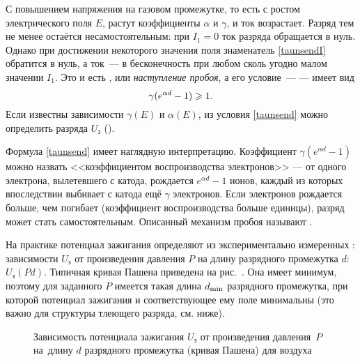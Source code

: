 С повышением напряжения на газовом промежутке, то есть с ростом электрического
поля $E$, растут коэффициенты $\alpha$ и $\gamma$, и ток возрастает.
Разряд тем не менее остаётся несамостоятельным: при $I_1=0$ ток разряда
обращается в нуль. Однако при достижении некоторого значения поля
знаменатель \eqref{taunsendI} обратится в нуль,
а ток~--- в бесконечность при любом сколь угодно малом значении $I_1$.
Это и есть , или \emph{наступление пробоя}, а его
условие~---  --- имеет вид
\begin{equation}
    \eqmark{taunsend}
	\gamma(e^{\alpha d}-1)\ge 1.
\end{equation}
Если известны зависимости $\gamma(E)$ и $\alpha(E)$, из условия \eqref{taunsend}
можно определить  разряда $U_{з}$
().

Формула \eqref{taunsend} имеет наглядную интерпретацию. 
Коэффициент $\gamma (e^{\alpha d}-1)$ можно назвать
<<коэффициентом воспроизводства электронов>> --- от одного электрона,
вылетевшего с катода, рождается $e^{\alpha d}-1$ ионов,
каждый из которых впоследствии выбивает с катода ещё $\gamma$ электронов.
Если электронов рождается больше, чем погибает (коэффициент воспроизводства больше единицы), 
разряд может стать самостоятельным.
Описанный механизм пробоя называют . 

На практике потенциал зажигания определяют из экспериментально измеренных
: зависимости $U_{з}$ от произведения
давления $P$ на длину разрядного промежутка $d$: $U_{з}(Pd)$.
Типичная кривая Пашена приведена на рис.~.
Она имеет минимум, поэтому для заданного $P$ имеется такая длина
$d_{\rm min}$ разрядного промежутка,
при которой потенциал зажигания и соответствующее ему поле минимальны
(это важно для структуры тлеющего разряда, см. ниже).

\begin{figure}[h!]
	\centering
\footnotesize	{}
	\caption{Зависимость потенциала зажигания $U_\text{з}$ от произведения
давления~$P$ на~длину $d$ разрядного промежутка (кривая Пашена) для воздуха}
\end{figure}



